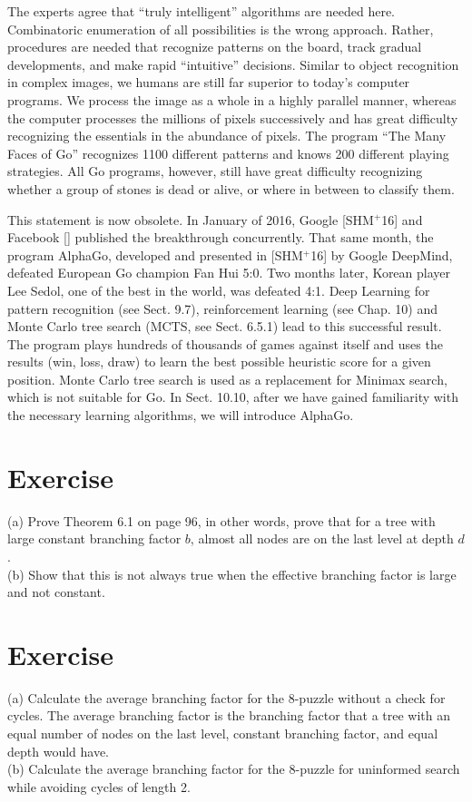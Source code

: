 \documentclass[10pt]{book}
\begin{document}
\begin{displayquote}
The experts agree that ``truly intelligent'' algorithms are needed here. Combinatoric enumeration of all possibilities is the wrong approach. Rather, procedures are needed that recognize patterns on the board, track gradual developments, and make rapid ``intuitive'' decisions. Similar to object recognition in complex images, we humans are still far superior to today's computer programs. We process the image as a whole in a highly parallel manner, whereas the computer processes the millions of pixels successively and has great difficulty recognizing the essentials in the abundance of pixels. The program ``The Many Faces of Go'' recognizes 1100 different patterns and knows 200 different playing strategies. All Go programs, however, still have great difficulty recognizing whether a group of stones is dead or alive, or where in between to classify them.
\end{displayquote}

This statement is now obsolete. In January of 2016, Google [SHM$^{+}$16] and Facebook [\cite{tian2016bettergo}] published the breakthrough concurrently. That same month, the program AlphaGo, developed and presented in [SHM$^{+}$16] by Google DeepMind, defeated European Go champion Fan Hui 5:0. Two months later, Korean player Lee Sedol, one of the best in the world, was defeated 4:1. Deep Learning for pattern recognition (see Sect. 9.7), reinforcement learning (see Chap. 10) and Monte Carlo tree search (MCTS, see Sect. 6.5.1) lead to this successful result.
The program plays hundreds of thousands of games against itself and uses the results (win, loss, draw) to learn the best possible heuristic score for a given position. Monte Carlo tree search is used as a replacement for Minimax search, which is not suitable for Go. In Sect. 10.10, after we have gained familiarity with the necessary learning algorithms, we will introduce AlphaGo.

\section{Exercise}
(a) Prove Theorem 6.1 on page 96, in other words, prove that for a tree with large constant branching factor $b$, almost all nodes are on the last level at depth $d$.\\
(b) Show that this is not always true when the effective branching factor is large and not constant.

\section{Exercise}
(a) Calculate the average branching factor for the 8-puzzle without a check for cycles. The average branching factor is the branching factor that a tree with an equal number of nodes on the last level, constant branching factor, and equal depth would have.\\
(b) Calculate the average branching factor for the 8-puzzle for uninformed search while avoiding cycles of length 2.
\end{document}
